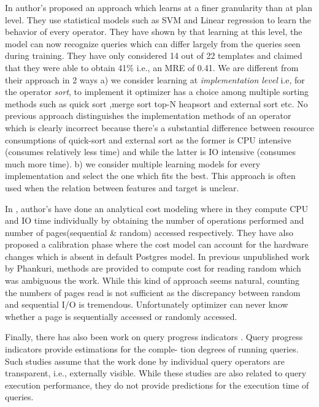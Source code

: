 \documentclass{article}
\begin{document}
\begin{multicols}{2}
	In \cite{ICDE2012, MSR} author's proposed an approach which learns at a finer granularity than 
	at plan level. They use statistical models such as SVM and Linear regression to learn the behavior of 
	every operator. They have shown by that learning at this level, the model can now recognize queries 		which can differ largely from the queries seen during training. They have only considered 14 out of 		22 templates and claimed that they were able to obtain 41\% i.e., an MRE of 0.41. We are different 			from their approach in 2 ways a) we consider learning at \textit{implementation level} i.e, for the operator \textit{sort}, to implement it optimizer has a choice among multiple sorting methods such as quick sort ,merge sort top-N heapsort and external sort etc. No previous approach distinguishes the implementation methods of an operator which is clearly incorrect because there's a substantial difference between resource consumptions of quick-sort and external sort as the former is CPU intensive (consumes relatively less time) and while the latter is IO intensive (consumes much more time). b) we consider multiple learning models for every implementation and select the one which fits the best. This approach is often used when the relation between features and target is unclear. 
	
	In \cite{analytical}, author's have done an analytical cost modeling where in they compute CPU and IO time individually by obtaining the number of operations performed and number of pages(sequential \& random) accessed respectively. They have also proposed a calibration phase where the cost model can account for the hardware changes which is absent in default Postgres model.  In previous unpublished work by Phankuri, methods are provided to compute cost for reading random which was ambiguous the work\cite{analytical}. While this kind of approach seems natural, counting the numbers of pages read is not sufficient as the discrepancy between random and sequential I/O is tremendous. Unfortunately optimizer can never know whether a page is sequentially accessed or randomly accessed.
	
	Finally, there has also been work on query progress indicators \cite{progress}. Query progress indicators provide estimations for the comple-
	tion degrees of running queries. Such studies assume that the work
	done by individual query operators are transparent, i.e., externally
	visible. While these studies are also related to query execution performance,
	they do not provide predictions for the execution time of
	queries.
	

\end{multicols}
\end{document}
